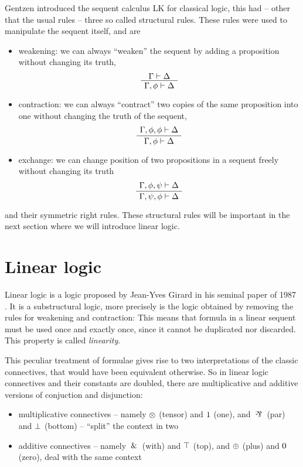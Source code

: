 \documentclass[a4paper, 12pt, tesi, english]{report}
\begin{document}
Gentzen introduced the sequent calculus LK for classical logic, this had -- other that the usual rules -- three so called structural rules.
These rules were used to manipulate the sequent itself, and are
\begin{itemize}
	\item weakening: we can always ``weaken'' the sequent by adding a proposition without changing its truth,
		$$
		\AxiomC{$\Gamma \vdash \Delta$}
		\UnaryInfC{$\Gamma, \phi \vdash \Delta$}
		\DisplayProof
		$$
	\item contraction: we can always ``contract'' two copies of the same proposition into one without changing the truth of the sequent,
		$$
		\AxiomC{$\Gamma, \phi, \phi \vdash \Delta$}
		\UnaryInfC{$\Gamma, \phi \vdash \Delta$}
		\DisplayProof
		$$
	\item exchange: we can change position of two propositions in a sequent freely without changing its truth
		$$
		\AxiomC{$\Gamma, \phi, \psi \vdash \Delta$}
		\UnaryInfC{$\Gamma, \psi, \phi \vdash \Delta$}
		\DisplayProof
		$$
\end{itemize}
and their symmetric right rules.
These structural rules will be important in the next section where we will introduce linear logic.

\section{Linear logic}
Linear logic is a logic proposed by Jean-Yves Girard in his seminal paper of 1987 \cite{LinearLogic}.
It is a substructural logic, more precisely is the logic obtained by removing the rules for weakening and contraction:
This means that formula in a linear sequent must be used once and exactly once, since it cannot be duplicated nor discarded.
This property is called \textit{linearity}.

This peculiar treatment of formulae gives rise to two interpretations of the classic connectives, that would have been equivalent otherwise. 
So in linear logic connectives and their constants are doubled, there are multiplicative and additive versions of conjuction and disjunction:
\begin{itemize}
	\item multiplicative connectives -- namely $\otimes$ (tensor) and $1$ (one), and $\llpar$ (par) and $\bot$ (bottom) -- ``split'' the context in two
	\item additive connectives -- namely $\:\&\:$ (with) and $\top$ (top), and $\oplus$ (plus) and $0$ (zero), deal with the same context
\end{itemize}
\end{document}
